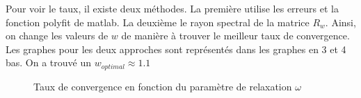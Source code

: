 \documentclass[a4paper,11pt]{article}
\begin{document}
Pour voir le taux, il existe deux méthodes.
La première utilise les erreurs
et la fonction polyfit de matlab. 
La deuxième le rayon spectral de la
matrice $R_w$. 
Ainsi,  on change  les valeurs  de $w$  de manière  à trouver le
meilleur taux de convergence. Les graphes  pour les deux approches sont représentés dans
les graphes en 3 et 4 bas.
On a trouvé un $w_{optimal}\approx 1.1$ 


\begin{figure}[h!]
  \begin{centering}
    \par\end{centering}
  \caption{Taux de convergence en fonction du paramètre de relaxation $\omega$}
  \label{rspro}
\end{figure}
\end{document}
